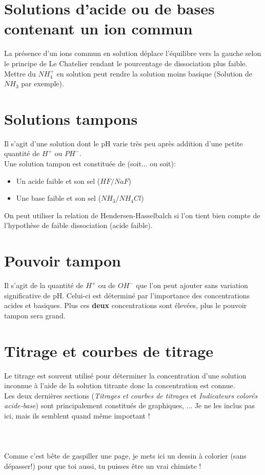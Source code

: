 \documentclass[british,french,11pt, a4paper, openany]{book}
\begin{document}
\section{Solutions d'acide ou de bases contenant un ion commun}
La présence d'un ions commun en solution déplace l'équilibre vers la gauche selon le principe de Le Chatelier rendant le pourcentage de dissociation plus faible. \\
Mettre du $NH_4^+$ en solution peut rendre la solution moins basique (Solution de $NH_3$ par exemple).

\section{Solutions tampons}
Il s'agit d'une solution dont le pH varie très peu après addition d'une petite quantité de $H^+$ ou $PH^-$.\\
Une solution tampon est constituée de (soit... ou soit): 
\begin{itemize}
	\item Un acide faible et son sel ($HF/NaF$)
	\item Une base faible et son sel ($NH_3/NH_4Cl$)
\end{itemize}
On peut utiliser la relation de Hendersen-Hasselbalch si l'on tient bien compte de l'hypothèse de faible dissociation (acide faible).

\section{Pouvoir tampon}
Il s'agit de la quantité de $H^+$ ou de $OH^-$ que l'on peut ajouter sans variation significative de pH. Celui-ci est déterminé par l'importance des concentrations acides et basiques. Plus ces \textbf{deux} concentrations sont élevées, plus le pouvoir tampon sera grand. 

\section{Titrage et courbes de titrage}
Le titrage est souvent utilisé pour déterminer la concentration d'une solution inconnue à l'aide de la solution titrante donc la concentration est connue.\\

Les deux dernières sections (\textit{Titrages et courbes de titrages} et \textit{Indicateurs colorés acide-base}) sont principalement constitués de graphiques, ... Je ne les inclus pas ici, mais ils semblent quand même important ! \\
\\
\\
\\
Comme c'est bête de gaspiller une page, je mets ici un dessin à colorier (sans dépasser!) pour que toi aussi, tu puisses être un vrai chimiste ! 
\end{document}
